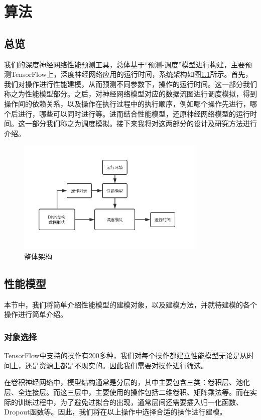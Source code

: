 \chapter{算法}
\label{cap:algorithm}
\section{总览}
    我们的深度神经网络性能预测工具，总体基于“预测-调度”模型进行构建，主要预测TensorFlow上，深度神经网络应用的运行时间，系统架构如图\ref{fig:arch}所示。首先，我们对操作进行性能建模，从而预测不同参数下，操作的运行时间。这一部分我们称之为性能模型部分。之后，对神经网络模型对应的数据流图进行调度模拟，得到操作间的依赖关系，以及操作在执行过程中的执行顺序，例如哪个操作先进行，哪个后进行，哪些可以同时进行等。进而结合性能模型，还原神经网络模型的运行时间。这一部分我们称之为调度模拟。接下来我将对这两部分的设计及研究方法进行介绍。

    \begin{figure}[!htbp]
        \centering
        \includegraphics[width=0.8\textwidth]{figures/arch.jpg}
        \caption{整体架构}
        \label{fig:arch}
    \end{figure}

    
\section{性能模型}
    本节中，我们将简单介绍性能模型的建模对象，以及建模方法，并就待建模的各个操作进行简单介绍。

\subsection{对象选择}
    TensorFlow中支持的操作有200多种，我们对每个操作都建立性能模型无论是从时间上，还是资源上都是不现实的。因此我们需要对操作进行筛选。

    在卷积神经网络中，模型结构通常是分层的，其中主要包含三类：卷积层、池化层、全连接层。而这三层中，主要使用的操作包括二维卷积、矩阵乘法等。而在实际的训练过程中，为了避免过拟合的出现，通常层间还需要插入归一化函数、Dropout函数等。因此，我们将在以上操作中选择合适的操作进行建模。
    
